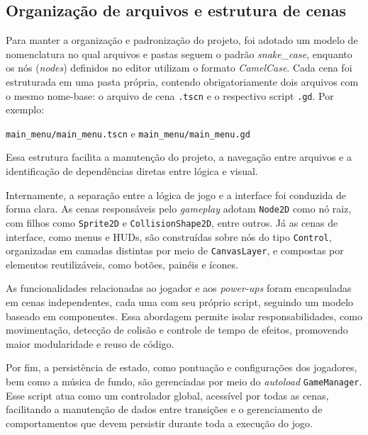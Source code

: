 \subsection{Organização de arquivos e estrutura de cenas}

Para manter a organização e padronização do projeto, foi adotado um modelo de nomenclatura no qual arquivos e pastas seguem o padrão \textit{snake\_case}, enquanto os nós (\textit{nodes}) definidos no editor utilizam o formato \textit{CamelCase}. Cada cena foi estruturada em uma pasta própria, contendo obrigatoriamente dois arquivos com o mesmo nome-base: o arquivo de cena \texttt{.tscn} e o respectivo script \texttt{.gd}. Por exemplo:

\begin{center}
\texttt{main\_menu/main\_menu.tscn} e \texttt{main\_menu/main\_menu.gd}
\end{center}

Essa estrutura facilita a manutenção do projeto, a navegação entre arquivos e a identificação de dependências diretas entre lógica e visual.

Internamente, a separação entre a lógica de jogo e a interface foi conduzida de forma clara. As cenas responsáveis pelo \textit{gameplay} adotam \texttt{Node2D} como nó raiz, com filhos como \texttt{Sprite2D} e \texttt{CollisionShape2D}, entre outros. Já as cenas de interface, como menus e HUDs, são construídas sobre nós do tipo \texttt{Control}, organizadas em camadas distintas por meio de \texttt{CanvasLayer}, e compostas por elementos reutilizáveis, como botões, painéis e ícones.

As funcionalidades relacionadas ao jogador e aos \textit{power-ups} foram encapsuladas em cenas independentes, cada uma com seu próprio script, seguindo um modelo baseado em componentes. Essa abordagem permite isolar responsabilidades, como movimentação, detecção de colisão e controle de tempo de efeitos, promovendo maior modularidade e reuso de código.

Por fim, a persistência de estado, como pontuação e configurações dos jogadores, bem como a música de fundo, são gerenciadas por meio do \textit{autoload} \texttt{GameManager}. Esse script atua como um controlador global, acessível por todas as cenas, facilitando a manutenção de dados entre transições e o gerenciamento de comportamentos que devem persistir durante toda a execução do jogo.


